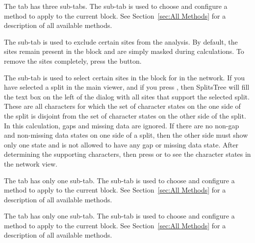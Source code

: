 \documentclass[11pt]{article}
\begin{document}

The  tab has three sub-tabs.
The  sub-tab is used to
choose and configure a method
to apply to the current  block.
See Section~\ref{sec:All Methods} for a description of all available
methods.

The  sub-tab is used to
exclude certain sites from the analysis.
By default, the sites remain present in the  block and
are simply masked during calculations. To remove the sites completely,
press the  button.

The  sub-tab is used to
select certain sites in the  block for
 in the network.
If you have selected a split in the main viewer, and if you
press , then SplitsTree will
fill the text box on the left of the dialog with all sites that
support the selected split. These are all characters for which
the set of character states on the one side of the split is
disjoint from the set of character states on the other side of the split.
In this calculation, gaps and missing data are ignored.
If there are no non-gap and non-missing data states on one side of a split,
then the other side must show only one state and is not allowed
to have any gap or missing data state.
After determining the supporting characters, then press  or  to see the character states
in the network view.


The  tab has only one sub-tab.
The  sub-tab is used to
choose and configure a method
to apply to the current  block.
See Section~\ref{sec:All Methods} for a description of all available
methods.

The  tab has only one sub-tab.
The  sub-tab is used to
choose and configure a method
to apply to the current  block.
See Section~\ref{sec:All Methods} for a description of all available
methods.
\end{document}

